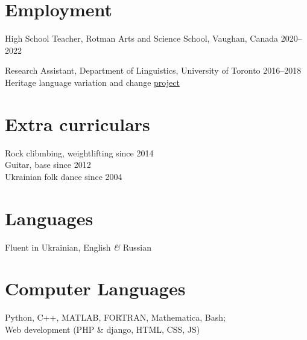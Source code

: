 \documentclass[margin,line]{res}
\begin{document}
\begin{resume}
\section{\sc Employment}
High School Teacher, Rotman Arts and Science School, Vaughan, Canada \hfill{2020--2022}

\vspace*{-2.5mm}

Research Assistant, Department of Linguistics, University of Toronto \hfill{2016--2018}\\
Heritage language variation and change \href{https://ngn.artsci.utoronto.ca/HLVC/0_0_home.php}{project}

\section{\sc Extra curriculars}

Rock clibmbing, weightlifting \hfill{since 2014}\\
Guitar, base \hfill{since 2012}\\
Ukrainian folk dance \hfill{since 2004}


\section{\sc Languages}

Fluent in Ukrainian, English \textit{\&} Russian
\section{\sc Computer Languages}

Python, C++, MATLAB, FORTRAN, Mathematica, Bash;\\
Web development (PHP \& django, HTML, CSS, JS)
\end{resume}
\end{document}

